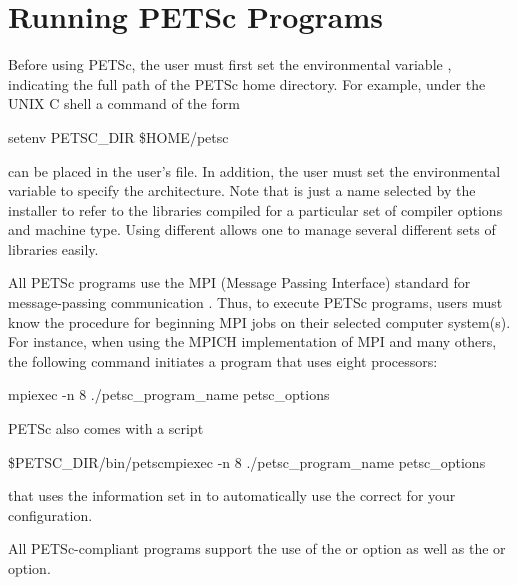 \section{Running PETSc Programs}
\label{sec_running}

Before using PETSc, the user must first set the environmental variable
,  indicating the full path of the PETSc home
directory.  For example, under the UNIX C shell a command of the form
\begin{tabbing}
   setenv PETSC\_DIR \$HOME/petsc
\end{tabbing}
 can be placed in the user's  file.  In addition, the user must set the environmental
variable {} to specify the architecture. Note that
{} is just a name selected by the installer to refer to
the libraries compiled for a particular set of compiler options and 
machine type. Using different {} allows one to manage
several different sets of libraries easily.

All PETSc programs use the MPI (Message Passing Interface) standard
for message-passing communication \cite{MPI-final}.  Thus, to execute
PETSc programs, users must know the procedure for beginning MPI jobs
on their selected computer system(s).  For instance, when using the
MPICH implementation of MPI \cite{mpich-web-page} and many others, the following
command initiates a program that uses eight processors:
  
\begin{tabbing}
   mpiexec -n 8 ./petsc\_program\_name petsc\_options
\end{tabbing}

PETSc also comes with a script 
\begin{tabbing}
   \${PETSC\_DIR}/bin/petscmpiexec -n 8 ./petsc\_program\_name petsc\_options
\end{tabbing}
that uses the information set in  to 
automatically use the correct  for your configuration.

All PETSc-compliant programs support the use of the 
 or  option as well as the  
or  option. 


